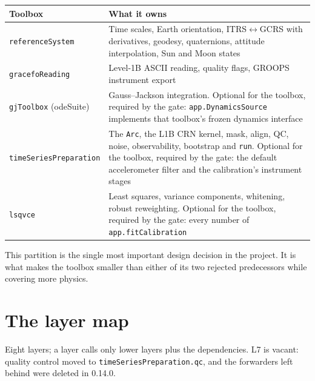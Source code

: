 \documentclass[11pt,a4paper]{report}
\begin{document}
\begin{table}[h]\centering\footnotesize
\begin{tabular}{@{}lp{9.6cm}@{}}\toprule
Toolbox & What it owns\\\midrule
\texttt{referenceSystem} & Time scales, Earth orientation, ITRS$\leftrightarrow$GCRS with
 derivatives, geodesy, quaternions, attitude interpolation, Sun and Moon states\\
\texttt{gracefoReading} & Level-1B ASCII reading, quality flags, GROOPS instrument export\\
\texttt{gjToolbox} (odeSuite) & Gauss--Jackson integration. Optional for the toolbox, required by
 the gate: \texttt{app.DynamicsSource} implements that toolbox's frozen dynamics interface\\
\texttt{timeSeriesPreparation} & The \texttt{Arc}, the L1B CRN kernel, mask, align, QC, noise,
 observability, bootstrap and \texttt{run}. Optional for the toolbox, required by the gate: the
 default accelerometer filter and the calibration's instrument stages\\
\texttt{lsqvce} & Least squares, variance components, whitening, robust reweighting. Optional for
 the toolbox, required by the gate: every number of \texttt{app.fitCalibration}\\
\bottomrule
\end{tabular}
\end{table}

\noindent This partition is the single most important design decision in the project. It is what
makes the toolbox smaller than either of its two rejected predecessors while covering more physics.

\section{The layer map}
Eight layers; a layer calls only lower layers plus the dependencies. L7 is vacant: quality
control moved to \texttt{timeSeriesPreparation.qc}, and the forwarders left behind were deleted in 0.14.0.
\end{document}
